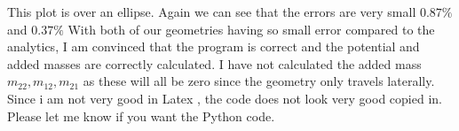 \documentclass[a4paper,norsk]{article}
\begin{document}
\newline
This plot is over an ellipse. Again we can see that the errors are very small $0.87 \% $  and $0.37\%$
With both of our geometries having so small error compared to the analytics, I am convinced that the program is correct and the potential and added masses are correctly calculated.
I have not calculated the added mass $m_{22}, m_{12}, m_{21}$ as these will all be zero since the geometry only travels laterally.
\newline
Since i am not very good in Latex , the code does not look very good copied in. Please let me know if you want the Python code.
\end{document}
